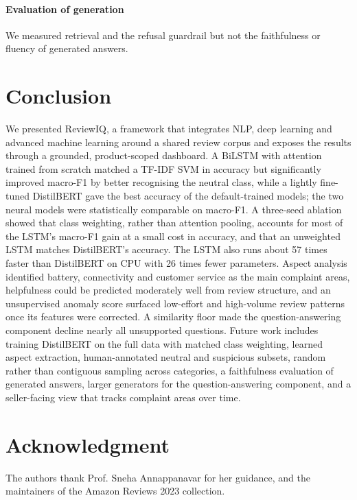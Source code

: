\documentclass[conference]{IEEEtran}
\begin{document}
\paragraph{Evaluation of generation} We measured retrieval and the refusal guardrail but not the faithfulness or fluency of generated answers.

\section{Conclusion}
We presented ReviewIQ, a framework that integrates NLP, deep learning and advanced machine learning around a shared review corpus and exposes the results through a grounded, product-scoped dashboard. A BiLSTM with attention trained from scratch matched a TF-IDF SVM in accuracy but significantly improved macro-F1 by better recognising the neutral class, while a lightly fine-tuned DistilBERT gave the best accuracy of the default-trained models; the two neural models were statistically comparable on macro-F1. A three-seed ablation showed that class weighting, rather than attention pooling, accounts for most of the LSTM's macro-F1 gain at a small cost in accuracy, and that an unweighted LSTM matches DistilBERT's accuracy. The LSTM also runs about 57 times faster than DistilBERT on CPU with 26 times fewer parameters. Aspect analysis identified battery, connectivity and customer service as the main complaint areas, helpfulness could be predicted moderately well from review structure, and an unsupervised anomaly score surfaced low-effort and high-volume review patterns once its features were corrected. A similarity floor made the question-answering component decline nearly all unsupported questions. Future work includes training DistilBERT on the full data with matched class weighting, learned aspect extraction, human-annotated neutral and suspicious subsets, random rather than contiguous sampling across categories, a faithfulness evaluation of generated answers, larger generators for the question-answering component, and a seller-facing view that tracks complaint areas over time.

\section*{Acknowledgment}
The authors thank Prof. Sneha Annappanavar for her guidance, and the maintainers of the Amazon Reviews 2023 collection.
\end{document}
